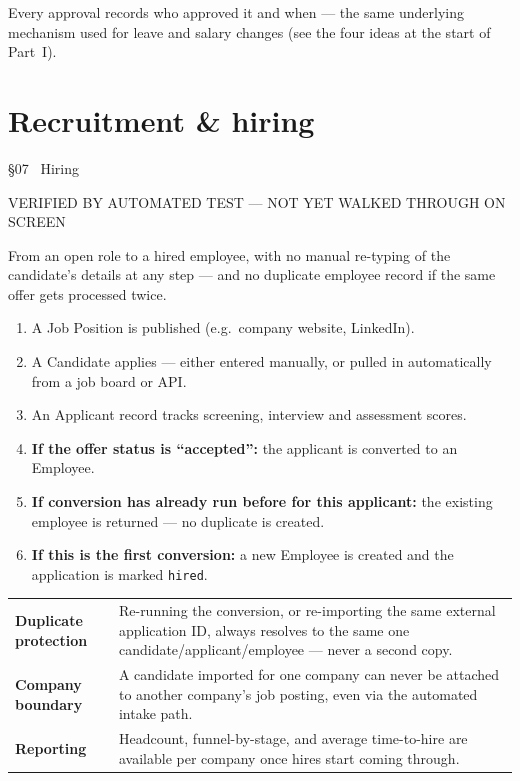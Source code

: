 \documentclass[11pt,a4paper]{article}
\newcommand{\eyebrow}[1]{{\small\ttfamily\color{accentdark} #1}\par\vspace{2pt}}
\begin{document}
\begin{note}
Every approval records who approved it and when --- the same underlying mechanism used for leave and salary changes (see the four ideas at the start of Part~I).
\end{note}

\section{Recruitment \& hiring}
\eyebrow{\S07 \textperiodcentered\ Hiring}
\begin{statusbox}{VERIFIED BY AUTOMATED TEST --- NOT YET WALKED THROUGH ON SCREEN}\end{statusbox}

From an open role to a hired employee, with no manual re-typing of the candidate's details at any step --- and no duplicate employee record if the same offer gets processed twice.

\begin{enumerate}[leftmargin=1.8em]
  \item A Job Position is published (e.g.\ company website, LinkedIn).
  \item A Candidate applies --- either entered manually, or pulled in automatically from a job board or API.
  \item An Applicant record tracks screening, interview and assessment scores.
  \item \textbf{If the offer status is ``accepted'':} the applicant is converted to an Employee.
  \item \textbf{If conversion has already run before for this applicant:} the existing employee is returned --- no duplicate is created.
  \item \textbf{If this is the first conversion:} a new Employee is created and the application is marked \texttt{hired}.
\end{enumerate}

\begin{center}
\small
\begin{tabular}{@{}p{4cm}p{9.5cm}@{}}
\toprule
\textbf{Duplicate protection} & Re-running the conversion, or re-importing the same external application ID, always resolves to the same one candidate/applicant/employee --- never a second copy. \\
\textbf{Company boundary} & A candidate imported for one company can never be attached to another company's job posting, even via the automated intake path. \\
\textbf{Reporting} & Headcount, funnel-by-stage, and average time-to-hire are available per company once hires start coming through. \\
\bottomrule
\end{tabular}
\end{center}
\end{document}
